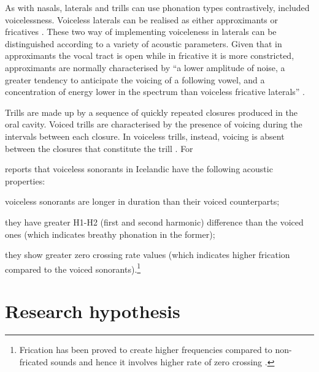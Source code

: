 \documentclass[11pt,a4paper,openany]{memoir}\usepackage[]{graphicx}\usepackage[]{color}
\begin{document}

As with nasals, laterals and trills can use phonation types contrastively, included voicelessness.
Voiceless laterals can be realised as either approximants or fricatives \citet{ladefoged1996}.
These two way of implementing voiceleness in laterals can be distinguished according to a variety of acoustic parameters.
Given that in approximants the vocal tract is open while in fricative it is more constricted, approximants are normally characterised by ``a lower amplitude of noise, a greater tendency to anticipate the voicing of a following vowel, and a concentration of energy lower in the spectrum than voiceless fricative laterals'' \citep[198]{ladefoged1996}.

Trills are made up by a sequence of quickly repeated closures produced in the oral cavity.
Voiced trills are characterised by the presence of voicing during the intervals between each closure.
In voiceless trills, instead, voicing is absent between the closures that constitute the trill \citep[236]{ladefoged1996}.
For 

\citet{bombien2006} reports that voiceless sonorants in Icelandic have the following acoustic properties: 
\begin{inparaenum}[(i)]
\item voiceless sonorants are longer in duration than their voiced counterparts;
\item they have greater H1-H2 (first and second harmonic) difference than the voiced ones (which indicates breathy phonation in the former);
\item they show greater zero crossing rate values (which indicates higher frication compared to the voiced sonorants).\footnote{Frication has been proved to create higher frequencies compared to non-fricated sounds and hence it involves higher rate of zero crossing \citep{weigelt1990}.}
\end{inparaenum}


\section{Research hypothesis}
\label{s:hypothesis}
\end{document}

